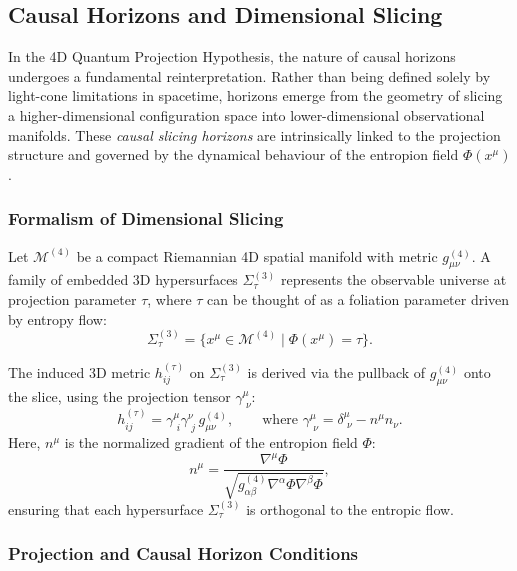 \documentclass[12pt]{article}
\begin{document}
\subsection{Causal Horizons and Dimensional Slicing}
\label{subsec:causal_horizons_slicing}

In the 4D Quantum Projection Hypothesis, the nature of causal horizons undergoes a fundamental reinterpretation. Rather than being defined solely by light-cone limitations in spacetime, horizons emerge from the geometry of slicing a higher-dimensional configuration space into lower-dimensional observational manifolds. These \emph{causal slicing horizons} are intrinsically linked to the projection structure and governed by the dynamical behaviour of the entropion field $\Phi(x^\mu)$.

\subsubsection*{Formalism of Dimensional Slicing}

Let $\mathcal{M}^{(4)}$ be a compact Riemannian 4D spatial manifold with metric $g^{(4)}_{\mu\nu}$. A family of embedded 3D hypersurfaces $\Sigma^{(3)}_\tau$ represents the observable universe at projection parameter $\tau$, where $\tau$ can be thought of as a foliation parameter driven by entropy flow:
\begin{equation}
\label{eq:4D_foliation_map}
\Sigma^{(3)}_\tau = \{ x^\mu \in \mathcal{M}^{(4)} \;|\; \Phi(x^\mu) = \tau \}.
\end{equation}

The induced 3D metric $h_{ij}^{(\tau)}$ on $\Sigma^{(3)}_\tau$ is derived via the pullback of $g^{(4)}_{\mu\nu}$ onto the slice, using the projection tensor $\gamma^\mu_{\,\,\nu}$:
\begin{equation}
\label{eq:induced_metric}
h_{ij}^{(\tau)} = \gamma^\mu_{\,\,i} \gamma^\nu_{\,\,j} \, g^{(4)}_{\mu\nu}, \qquad \text{where } \gamma^\mu_{\,\,\nu} = \delta^\mu_{\,\,\nu} - n^\mu n_\nu.
\end{equation}
Here, $n^\mu$ is the normalized gradient of the entropion field $\Phi$:
\begin{equation}
\label{eq:entropion_normal}
n^\mu = \frac{\nabla^\mu \Phi}{\sqrt{g^{(4)}_{\alpha\beta} \nabla^\alpha \Phi \nabla^\beta \Phi}},
\end{equation}
ensuring that each hypersurface $\Sigma^{(3)}_\tau$ is orthogonal to the entropic flow.

\subsubsection*{Projection and Causal Horizon Conditions}
\end{document}
